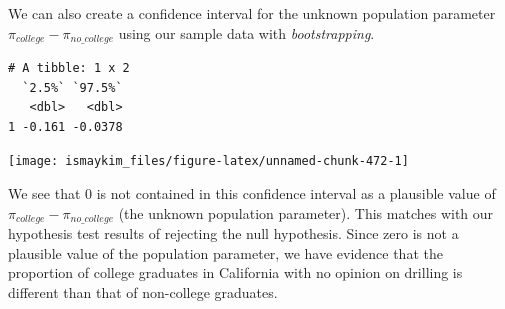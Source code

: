 \documentclass[12pt, krantz2,]{krantz}
\makeatletter
\newenvironment{Shaded}{\begin{snugshade}}{\end{snugshade}}
\newcommand{\DataTypeTok}[1]{\textcolor[rgb]{0.27,0.27,0.27}{#1}}
\newcommand{\DecValTok}[1]{\textcolor[rgb]{0.06,0.06,0.06}{#1}}
\newcommand{\KeywordTok}[1]{\textcolor[rgb]{0.27,0.27,0.27}{\textbf{#1}}}
\newcommand{\NormalTok}[1]{#1}
\newcommand{\OperatorTok}[1]{\textcolor[rgb]{0.43,0.43,0.43}{\textbf{#1}}}
\newcommand{\StringTok}[1]{\textcolor[rgb]{0.5,0.5,0.5}{#1}}
\newenvironment{kframe}{%
\medskip{}
\setlength{\fboxsep}{.8em}
 \def\at@end@of@kframe{}%
 \ifinner\ifhmode%
  \def\at@end@of@kframe{\end{minipage}}%
  \begin{minipage}{\columnwidth}%
 \fi\fi%
 \def\FrameCommand##1{\hskip\@totalleftmargin \hskip-\fboxsep
 \colorbox{shadecolor}{##1}\hskip-\fboxsep
     \hskip-\linewidth \hskip-\@totalleftmargin \hskip\columnwidth}%
 \MakeFramed {\advance\hsize-\width
   \@totalleftmargin\z@ \linewidth\hsize
   \@setminipage}}%
 {\par\unskip\endMakeFramed%
 \at@end@of@kframe}
\renewenvironment{Shaded}{\begin{kframe}}{\end{kframe}}
\makeatother
\begin{document}
We can also create a confidence interval for the unknown population parameter \(\pi_{college} - \pi_{no\_college}\) using our sample data with \emph{bootstrapping}.

\begin{Shaded}
\end{Shaded}

\begin{Shaded}
\end{Shaded}

\begin{verbatim}
# A tibble: 1 x 2
  `2.5%` `97.5%`
   <dbl>   <dbl>
1 -0.161 -0.0378
\end{verbatim}

\begin{Shaded}
\end{Shaded}

\begin{center}\texttt{[image: ismaykim\_files/figure-latex/unnamed-chunk-472-1]} \end{center}

We see that 0 is not contained in this confidence interval as a plausible value of \(\pi_{college} - \pi_{no\_college}\) (the unknown population parameter). This matches with our hypothesis test results of rejecting the null hypothesis. Since zero is not a plausible value of the population parameter, we have evidence that the proportion of college graduates in California with no opinion on drilling is different than that of non-college graduates.
\end{document}
